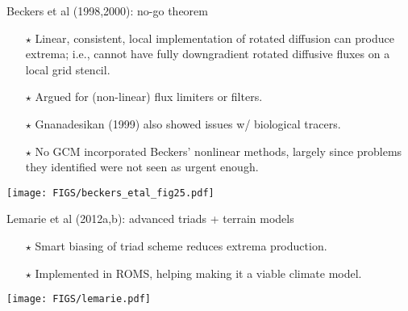\documentclass{beamer}
\begin{document}
\begin{frame}{Beckers et al (1998,2000): no-go theorem}

\begin{itemize}
 \item[$\star$] Linear, consistent, local implementation of rotated diffusion can produce extrema; i.e., cannot have fully downgradient rotated diffusive fluxes on a local grid stencil.
 
\item[$\star$] Argued for (non-linear) flux limiters or filters.  
  
\item[$\star$] Gnanadesikan (1999) also showed issues w/ biological tracers.  

\item[$\star$] No GCM incorporated Beckers' nonlinear methods, largely since problems they identified were not seen as urgent enough. 
  
\end{itemize}

\begin{center}
\texttt{[image: FIGS/beckers\_etal\_fig25.pdf]}
\end{center}
 
 

\end{frame}


\begin{frame}{Lemarie et al (2012a,b): advanced triads + terrain models}

\begin{itemize}
 \item[$\star$] Smart biasing of triad scheme reduces extrema production. 
 \item[$\star$] Implemented in ROMS, helping making it a viable climate model. 
\end{itemize}

\begin{center}
\texttt{[image: FIGS/lemarie.pdf]}
\end{center}

\end{frame}
\end{document}
